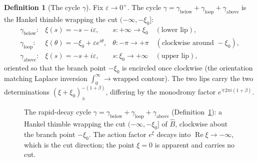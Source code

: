 \documentclass[11pt,reqno]{amsart}
\renewcommand{\_}{\vquadorigunderscore\allowbreak}
\theoremstyle{plain}
\theoremstyle{definition}
\newtheorem{definition}[theorem]{Definition}
\newcommand{\Bhat}{\widehat{B}}
\newcommand{\xizero}{\xi_0}
\begin{document}
\begin{definition}[The cycle $\gamma$]\label{def:gamma}
Fix $\varepsilon\to0^+$. The cycle $\gamma=\gamma_{\mathrm{below}}+\gamma_{\mathrm{loop}}
+\gamma_{\mathrm{above}}$ is the Hankel thimble wrapping the cut $(-\infty,-\xizero]$:
\[
\begin{array}{lll}
  \gamma_{\mathrm{below}}: & \xi(s)=-s-i\varepsilon, & s:+\infty\to\xizero \quad(\text{lower lip}),\\[2pt]
  \gamma_{\mathrm{loop}}:  & \xi(\theta)=-\xizero+\varepsilon e^{i\theta}, & \theta:-\pi\to+\pi
        \quad(\text{clockwise around }-\xizero),\\[2pt]
  \gamma_{\mathrm{above}}: & \xi(s)=-s+i\varepsilon, & s:\xizero\to+\infty \quad(\text{upper lip}),
\end{array}
\]
oriented so that the branch point $-\xizero$ is encircled once clockwise (the orientation matching
Laplace inversion $\int_0^\infty\!\to\!\text{wrapped contour}$). The two lips carry the two
determinations $(\xi+\xizero)^{-(1+\beta)}_{\pm}$, differing by the monodromy factor
$e^{\mp2\pi i(1+\beta)}$.
\end{definition}

\begin{figure}[h]
\centering
{}
\caption{The rapid-decay cycle $\gamma=\gamma_{\mathrm{below}}+\gamma_{\mathrm{loop}}
+\gamma_{\mathrm{above}}$ (Definition~\ref{def:gamma}): a Hankel thimble wrapping the cut
$(-\infty,-\xizero]$ of $\Bhat$, clockwise about the branch point $-\xizero$. The action factor
$e^{\xi}$ decays into $\operatorname{Re}\xi\to-\infty$, which is the cut direction; the point
$\xi=0$ is apparent and carries no cut.}
\label{fig:gamma}
\end{figure}
\end{document}
